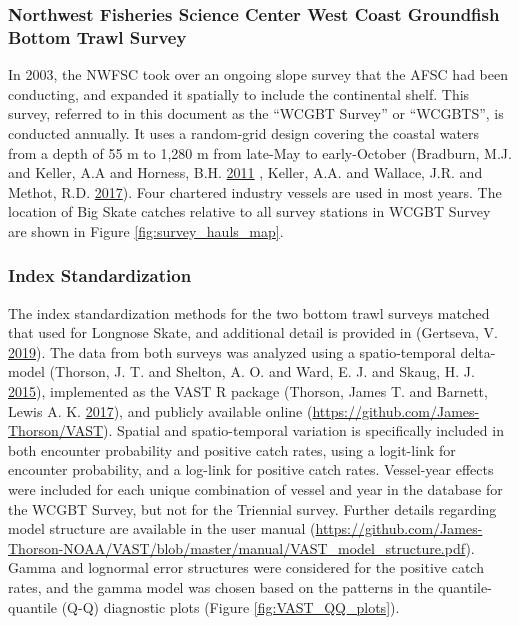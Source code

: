 \documentclass[12pt,]{article}
\begin{document}
\hypertarget{northwest-fisheries-science-center-west-coast-groundfish-bottom-trawl-survey}{%
\subsubsection{Northwest Fisheries Science Center West Coast Groundfish
Bottom Trawl
Survey}\label{northwest-fisheries-science-center-west-coast-groundfish-bottom-trawl-survey}}

In 2003, the NWFSC took over an ongoing slope survey that the AFSC had
been conducting, and expanded it spatially to include the continental
shelf. This survey, referred to in this document as the ``WCGBT Survey''
or ``WCGBTS'', is conducted annually. It uses a random-grid design
covering the coastal waters from a depth of 55 m to 1,280 m from
late-May to early-October (Bradburn, M.J. and Keller, A.A and Horness,
B.H. \protect\hyperlink{ref-Bradburn2011}{2011} , Keller, A.A. and
Wallace, J.R. and Methot, R.D.
\protect\hyperlink{ref-Keller2017}{2017}). Four chartered industry
vessels are used in most years. The location of Big Skate catches
relative to all survey stations in WCGBT Survey are shown in Figure
\ref{fig:survey_hauls_map}.

\hypertarget{index-standardization}{%
\subsubsection{Index Standardization}\label{index-standardization}}

The index standardization methods for the two bottom trawl surveys
matched that used for Longnose Skate, and additional detail is provided
in (Gertseva, V. \protect\hyperlink{ref-Gertseva2019}{2019}). The data
from both surveys was analyzed using a spatio-temporal delta-model
(Thorson, J. T. and Shelton, A. O. and Ward, E. J. and Skaug, H. J.
\protect\hyperlink{ref-Thorson2015}{2015}), implemented as the VAST R
package (Thorson, James T. and Barnett, Lewis A. K.
\protect\hyperlink{ref-Thorson2017a}{2017}), and publicly available
online (\url{https://github.com/James-Thorson/VAST}). Spatial and
spatio-temporal variation is specifically included in both encounter
probability and positive catch rates, using a logit-link for encounter
probability, and a log-link for positive catch rates. Vessel-year
effects were included for each unique combination of vessel and year in
the database for the WCGBT Survey, but not for the Triennial survey.
Further details regarding model structure are available in the user
manual
(\url{https://github.com/James-Thorson-NOAA/VAST/blob/master/manual/VAST_model_structure.pdf}).
Gamma and lognormal error structures were considered for the positive
catch rates, and the gamma model was chosen based on the patterns in the
quantile-quantile (Q-Q) diagnostic plots (Figure
\ref{fig:VAST_QQ_plots}).
\end{document}
